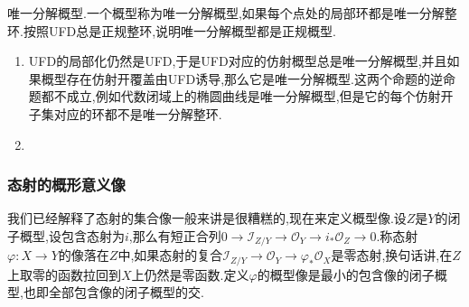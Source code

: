 唯一分解概型.一个概型称为唯一分解概型,如果每个点处的局部环都是唯一分解整环.按照UFD总是正规整环,说明唯一分解概型都是正规概型.
\begin{enumerate}
	\item UFD的局部化仍然是UFD,于是UFD对应的仿射概型总是唯一分解概型,并且如果概型存在仿射开覆盖由UFD诱导,那么它是唯一分解概型.这两个命题的逆命题都不成立,例如代数闭域上的椭圆曲线是唯一分解概型,但是它的每个仿射开子集对应的环都不是唯一分解整环.
	\item 
\end{enumerate} 

\subsubsection{态射的概形意义像}

我们已经解释了态射的集合像一般来讲是很糟糕的,现在来定义概型像.设$Z$是$Y$的闭子概型,设包含态射为$i$,那么有短正合列$0\to\mathscr{I}_{Z/Y}\to\mathscr{O}_Y\to i_*\mathscr{O}_Z\to0$.称态射$\varphi:X\to Y$的像落在$Z$中,如果态射的复合$\mathscr{I}_{Z/Y}\to\mathscr{O}_Y\to\varphi_*\mathscr{O}_X$是零态射,换句话讲,在$Z$上取零的函数拉回到$X$上仍然是零函数.定义$\varphi$的概型像是最小的包含像的闭子概型,也即全部包含像的闭子概型的交.
